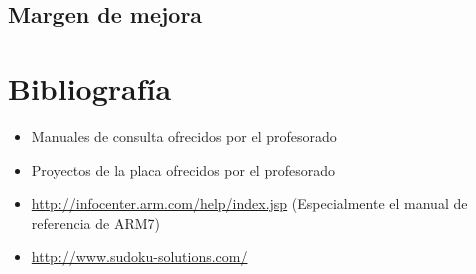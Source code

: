 \documentclass[12pt,letterpaper]{article}
\begin{document}
\subsection{Margen de mejora}

\section{Bibliografía}
\begin{itemize}
\item Manuales de consulta ofrecidos por el profesorado
\item Proyectos de la placa ofrecidos por el profesorado
\item \url{http://infocenter.arm.com/help/index.jsp} (Especialmente el
  manual de referencia de ARM7)
\item \url{http://www.sudoku-solutions.com/}
\end{itemize}
\end{document}
